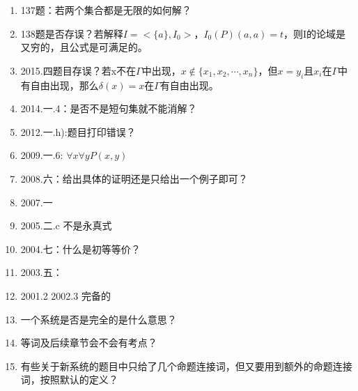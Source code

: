 \documentclass[a4paper]{ctexart}
\newcommand{\blankspace}[1]{\vskip #1\baselineskip}
\begin{document}
\begin{enumerate}
  \item 137题：若两个集合都是无限的如何解？
   
  \item 138题是否存误？若解释$I=<\{a\},I_0>$，$I_0(P)(a,a)=t$，则I的论域是又穷的，且公式是可满足的。
  
  \blankspace{3}
  
  \item 2015.四题目存误？若x不在$\Gamma$中出现，$x\not\in\{x_1,x_2,\cdots,x_n\}$，但$x=y_i$且$x_i$在$\Gamma$中有自由出现，那么$\delta(x)=x$在$\Gamma$有自由出现。
  
  \item 2014.一.4：是否不是短句集就不能消解？
  
  \item 2012.一.h):题目打印错误？
  
  \item 2009.一.6: $\forall{x}\forall{y}P(x,y)$
  
  \item 2008.六：给出具体的证明还是只给出一个例子即可？
    
  \item 2007.一
  
  \item 2005.二.c 不是永真式    
   
  
  \item 2004.七：什么是初等等价？
   
  
  \item 2003.五：
  
  \item 2001.2 2002.3 完备的
  
  \item 一个系统是否是完全的是什么意思？
  
  
  \blankspace{3}
  \item 等词及后续章节会不会有考点？
  
  \item 有些关于新系统的题目中只给了几个命题连接词，但又要用到额外的命题连接词，按照默认的定义？
  

\end{enumerate}
  
\end{document}
